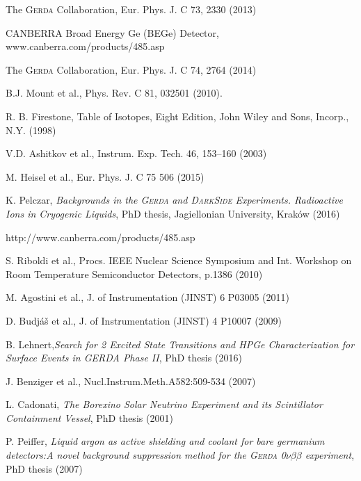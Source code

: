 \documentclass[twocolumn,epjc3]{svjour3}
\newcommand{\Gerda} {{\textsc{Gerda}\xspace}}
\begin{document}
\begin{thebibliography}{}
%
%
 The \Gerda{} Collaboration, Eur. Phys. J. C 73, 2330 (2013)

 CANBERRA Broad Energy Ge (BEGe) Detector, www.canberra.com/products/485.asp

 The \Gerda{} Collaboration, Eur. Phys. J. C 74, 2764 (2014)

 B.J. Mount et al., Phys. Rev. C 81, 032501 (2010).

 R. B. Firestone, Table of Isotopes, Eight Edition, John Wiley and Sons, Incorp., N.Y. (1998)

 V.D. Ashitkov et al., Instrum. Exp. Tech. 46, 153–160 (2003)

 M. Heisel et al., Eur. Phys. J. C 75 506 (2015)

  K. Pelczar, \textit{Backgrounds in the \Gerda{} and \textsc{DarkSide} Experiments. Radioactive Ions in Cryogenic Liquids}, PhD thesis, Jagiellonian University, Krak\'{o}w (2016)

 http://www.canberra.com/products/485.asp

 S. Riboldi et al., Procs. IEEE Nuclear Science Symposium and Int. Workshop on Room Temperature Semiconductor Detectors, p.1386 (2010)

 M. Agostini et al., J. of Instrumentation (JINST) 6  P03005 (2011)

  D. Budj\'{a}\v{s} et al., J. of Instrumentation (JINST) 4  P10007 (2009)

  B. Lehnert,\textit{Search for 2\textnu\textbeta\textbeta\xspace Excited State Transitions
and HPGe Characterization for Surface Events in GERDA Phase II}, PhD thesis (2016)

  J. Benziger et al., Nucl.Instrum.Meth.A582:509-534 (2007)

  L. Cadonati, \textit{The Borexino Solar Neutrino Experiment and its Scintillator Containment Vessel}, PhD thesis (2001)

  P. Peiffer, \textit{Liquid argon as active shielding and coolant for bare germanium detectors:A novel background suppression method for the \Gerda{} 0$\nu\beta\beta$ experiment}, PhD thesis (2007)
 

\end{thebibliography}
\end{document}
